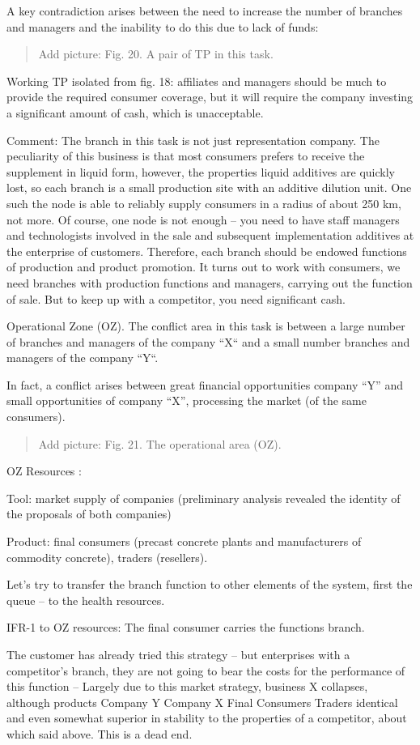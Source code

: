 \documentclass[11pt,a4paper]{book}
\newcommand{\addpicture}[1]{
  \begin{quote} Add picture: #1\end{quote}
}
\begin{document}
A key contradiction arises between the need to increase the number of
branches and managers and the inability to do this due to lack of funds:

\addpicture{Fig. 20. A pair of TP in this task.}

Working TP isolated from fig. 18: affiliates and managers should be much to
provide the required consumer coverage, but it will require the company
investing a significant amount of cash, which is unacceptable.

Comment: The branch in this task is not just representation company. The
peculiarity of this business is that most consumers prefers to receive the
supplement in liquid form, however, the properties liquid additives are
quickly lost, so each branch is a small production site with an additive
dilution unit. One such the node is able to reliably supply consumers in a
radius of about 250 km, not more. Of course, one node is not enough -- you
need to have staff managers and technologists involved in the sale and
subsequent implementation additives at the enterprise of customers. Therefore,
each branch should be endowed functions of production and product promotion.
It turns out to work with consumers, we need branches with production
functions and managers, carrying out the function of sale. But to keep up with
a competitor, you need significant cash.

Operational Zone (OZ). The conflict area in this task is between a large
number of branches and managers of the company “X“ and a small number branches
and managers of the company “Y“.

In fact, a conflict arises between great financial opportunities company “Y”
and small opportunities of company “X”, processing the market (of the same
consumers).

\addpicture{Fig. 21. The operational area (OZ).}

OZ Resources :

Tool: market supply of companies (preliminary analysis revealed the identity
of the proposals of both companies)

Product: final consumers (precast concrete plants and manufacturers of
commodity concrete), traders (resellers).

Let's try to transfer the branch function to other elements of the system,
first the queue -- to the health resources.

IFR-1 to OZ resources: The final consumer carries the functions branch.

The customer has already tried this strategy -- but enterprises with a
competitor’s branch, they are not going to bear the costs for the performance
of this function -- Largely due to this market strategy, business X collapses,
although products Company Y Company X Final Consumers Traders identical and
even somewhat superior in stability to the properties of a competitor, about
which said above. This is a dead end.
\end{document}
